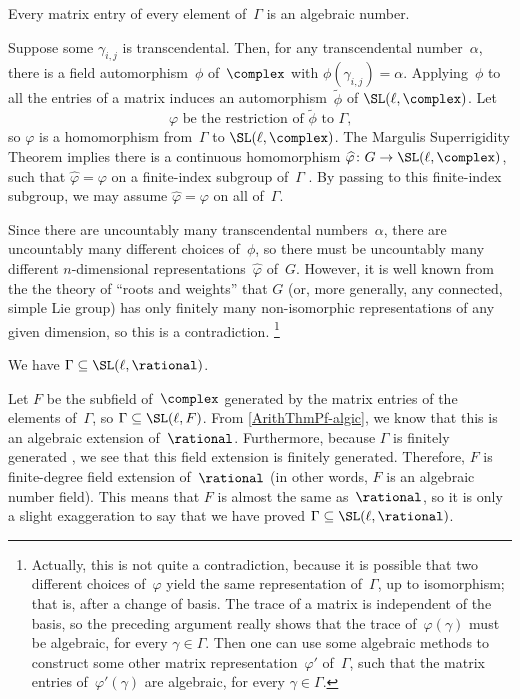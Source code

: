 \setcounter{step}{0}

\begin{step} \label{ArithThmPf-algic}
 Every matrix entry of every element of\/~$\Gamma$ is an
algebraic number.
 \end{step}
 Suppose some $\gamma_{i,j}$ is transcendental.
 Then, for any transcendental number~$\alpha$, there is a
field automorphism~$\phi$ of~$\complex$ with
$\phi(\gamma_{i,j}) = \alpha$. Applying~$\phi$ to all the
entries of a matrix induces an automorphism~$\widetilde\phi$
of $\SL(\ell,\complex)$. Let
	$$ \text{$\varphi$ be the restriction of~$\widetilde\phi$ to~$\Gamma$,} $$
so $\varphi$ is a homomorphism from~$\Gamma$ to $\SL(\ell,\complex)$.
The Margulis Superrigidity Theorem implies there is a
continuous homomorphism $\widehat\varphi \colon G \to
\SL(\ell,\complex)$, such that $\widehat\varphi = \varphi$ on
a finite-index subgroup of~$\Gamma$ . By passing to this finite-index subgroup,
we may assume $\widehat\varphi = \varphi$ on all of~$\Gamma$.

Since there are uncountably many transcendental
numbers~$\alpha$, there are uncountably many different
choices of~$\phi$, so there must be uncountably many
different $n$-dimensional representations~$\widehat\varphi$
of~$G$. However, it is well known from the the theory of
``roots and weights'' that $G$ (or, more generally, any
connected, simple Lie group) has
only finitely many non-isomorphic representations
of any given dimension, so this is a contradiction.%
\footnote{Actually, this is not quite a
contradiction, because it is possible that two different
choices of~$\varphi$ yield the same representation of~$\Gamma$,
up to isomorphism; that is, after a change of basis. The
trace of a matrix is independent of the basis, so the
preceding argument really shows that the trace
of~$\varphi(\gamma)$ must be algebraic, for every
$\gamma \in \Gamma$. Then one can use some algebraic methods
to construct some other matrix representation~$\varphi'$
of~$\Gamma$, such that the matrix entries of~$\varphi'(\gamma)$
are algebraic, for every $\gamma \in \Gamma$.}

\begin{step}
 We have\/ $\Gamma \subseteq \SL(\ell,\rational)$.
 \end{step}
 Let $F$ be the subfield of~$\complex$ generated by the 
matrix entries of the elements of~$\Gamma$, so $\Gamma 
\subseteq \SL(\ell,F)$. From \cref{ArithThmPf-algic}, we know
that this is an algebraic extension of~$\rational$.
Furthermore, because $\Gamma$ is finitely generated , 
we see that this field extension is finitely
generated. Therefore, $F$ is finite-degree field extension
of~$\rational$ (in other words, $F$ is an algebraic number
field). This means that $F$ is almost the same
as~$\rational$, so it is only a slight exaggeration to say
that we have proved $\Gamma  \subseteq \SL(\ell,\rational)$.


